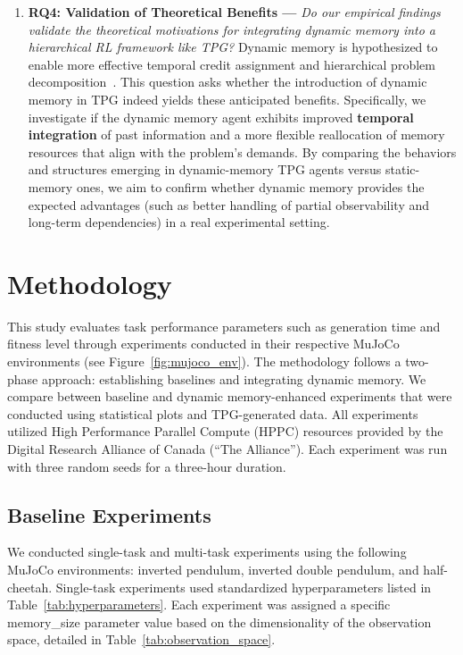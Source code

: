 \documentclass[sigconf]{acmart}
\begin{document}
\begin{enumerate}
    \item \textbf{RQ4: Validation of Theoretical Benefits ---} \textit{Do our empirical findings validate the theoretical motivations for integrating dynamic memory into a hierarchical RL framework like TPG?} Dynamic memory is hypothesized to enable more effective temporal credit assignment and hierarchical problem decomposition~\cite{Kelly21TELO}. This question asks whether the introduction of dynamic memory in TPG indeed yields these anticipated benefits. Specifically, we investigate if the dynamic memory agent exhibits improved \textbf{temporal integration} of past information and a more flexible reallocation of memory resources that align with the problem's demands. By comparing the behaviors and structures emerging in dynamic-memory TPG agents versus static-memory ones, we aim to confirm whether dynamic memory provides the expected advantages (such as better handling of partial observability and long-term dependencies) in a real experimental setting.
\end{enumerate}

\section{Methodology}
\label{sec:methodology}

This study evaluates task performance parameters such as generation time and 
fitness level through experiments conducted in their respective MuJoCo environments 
(see Figure~\ref{fig:mujoco_env}). The methodology follows a two-phase approach: establishing baselines
and integrating dynamic memory. We compare between baseline and dynamic memory-enhanced
experiments that were conducted using statistical plots and TPG-generated data. All
experiments utilized High Performance Parallel Compute (HPPC) resources provided by the
Digital Research Alliance of Canada (“The Alliance”). Each experiment was run with three
random seeds for a three-hour duration.

\subsection{Baseline Experiments}
We conducted single-task and multi-task experiments using the following MuJoCo environments:
inverted pendulum, inverted double pendulum, and half-cheetah. Single-task experiments used standardized
hyperparameters listed in Table~\ref{tab:hyperparameters}. Each experiment was assigned a specific memory\_size 
parameter value based on the dimensionality of the observation space, detailed in Table~\ref{tab:observation_space}.
\end{document}
